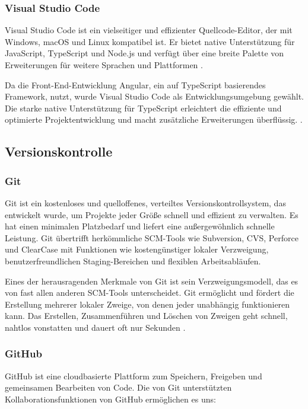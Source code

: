 \subsubsection{Visual Studio Code}

 Visual Studio Code ist ein vielseitiger und effizienter Quellcode-Editor, der mit Windows, macOS und Linux kompatibel ist. Er bietet native Unterstützung für JavaScript, TypeScript und Node.js und verfügt über eine breite Palette von Erweiterungen für weitere Sprachen und Plattformen \cite{visual-studio:o.J}.

Da die Front-End-Entwicklung Angular, ein auf TypeScript basierendes Framework, nutzt, wurde Visual Studio Code als Entwicklungsumgebung gewählt. Die starke native Unterstützung für TypeScript erleichtert die effiziente und optimierte Projektentwicklung und macht zusätzliche Erweiterungen überflüssig. \cite{visualstudio-angular:o.J}.

\subsection{Versionskontrolle}

\subsubsection{Git}
Git ist ein kostenloses und quelloffenes, verteiltes Versionskontrollsystem, das entwickelt wurde, um Projekte jeder Größe schnell und effizient zu verwalten. Es hat einen minimalen Platzbedarf und liefert eine außergewöhnlich schnelle Leistung. Git übertrifft herkömmliche SCM-Tools wie Subversion, CVS, Perforce und ClearCase mit Funktionen wie kostengünstiger lokaler Verzweigung, benutzerfreundlichen Staging-Bereichen und flexiblen Arbeitsabläufen.

Eines der herausragenden Merkmale von Git ist sein Verzweigungsmodell, das es von fast allen anderen SCM-Tools unterscheidet. Git ermöglicht und fördert die Erstellung mehrerer lokaler Zweige, von denen jeder unabhängig funktionieren kann. Das Erstellen, Zusammenführen und Löschen von Zweigen geht schnell, nahtlos vonstatten und dauert oft nur Sekunden  \cite{git-scmr:o.J}.

\subsubsection{GitHub}
GitHub ist eine cloudbasierte Plattform zum Speichern, Freigeben und gemeinsamen Bearbeiten von Code. Die von Git unterstützten Kollaborationsfunktionen von GitHub ermöglichen es uns:


